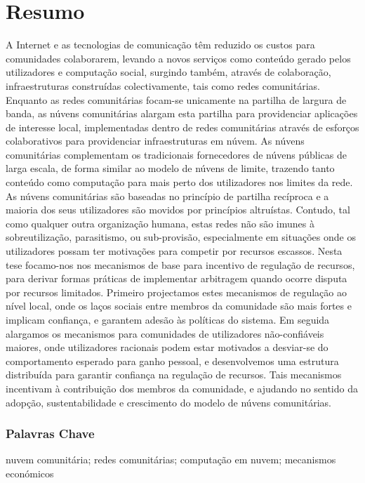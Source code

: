 

\chapter*{Resumo}

A Internet e as tecnologias de comunicação têm reduzido os custos para comunidades colaborarem, 
levando a novos serviços como conteúdo gerado pelos utilizadores e computação social, 
surgindo também, através de colaboração, infraestruturas construídas colectivamente, tais como redes comunitárias.
Enquanto as redes comunitárias focam-se unicamente na partilha de largura de banda, 
as núvens comunitárias alargam esta partilha para providenciar aplicações de interesse local, 
implementadas dentro de redes comunitárias através de esforços colaborativos para providenciar infraestruturas em núvem.
As núvens comunitárias complementam os tradicionais fornecedores de núvens públicas de larga escala, de forma similar ao modelo de núvens de limite, 
trazendo tanto conteúdo como computação para mais perto dos utilizadores nos limites da rede.
As núvens comunitárias são baseadas no princípio de partilha recíproca e a maioria dos seus utilizadores são movidos por princípios altruístas.
Contudo, tal como qualquer outra organização humana, estas redes não são imunes à sobreutilização, parasitismo, 
ou sub-provisão, especialmente em situações onde os utilizadores possam ter motivações para competir por recursos escassos.
Nesta tese focamo-nos nos mecanismos de base para incentivo de regulação de recursos, 
para derivar formas práticas de implementar arbitragem quando ocorre disputa por recursos limitados.
Primeiro projectamos estes mecanismos de regulação ao nível local, 
onde os laços sociais entre membros da comunidade são mais fortes e implicam confiança, e garantem adesão às políticas do sistema.
Em seguida alargamos os mecanismos para comunidades de utilizadores não-confiáveis maiores, 
onde utilizadores racionais podem estar motivados a desviar-se do comportamento esperado para ganho pessoal, 
e desenvolvemos uma estrutura distribuída para garantir confiança na regulação de recursos.
Tais mecanismos incentivam à contribuição dos membros da comunidade, e ajudando no sentido da adopção, 
sustentabilidade e crescimento do modelo de núvens comunitárias.

\vfill

\subsection*{Palavras Chave}
	nuvem comunitária;
	redes comunitárias;
	computação em nuvem;
	mecanismos económicos


